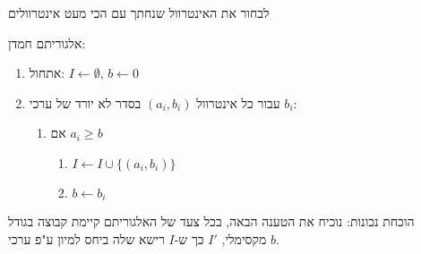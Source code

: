 לבחור את האינטרוול שנחתך עם הכי מעט אינטרוולים
\begin{center}
\end{center}
אלגוריתם חמדן:
\begin{enumerate}
\item
אתחול:
$I \leftarrow \emptyset$, 
$b \leftarrow 0$
\item
עבור כל אינטרוול 
$(a_i, b_i)$
בסדר לא יורד של ערכי 
$b_i$:
	\begin{enumerate}
	\item
	אם 
	$a_i \geq b$
		\begin{enumerate}
		\item
		$I \leftarrow I \cup \{(a_i, b_i)\}$
		\item
		$b \leftarrow b_i$				
		\end{enumerate}

	\end{enumerate}
\end{enumerate}

הוכחת נכונות: נוכיח את הטענה הבאה, בכל צעד של האלגוריתם קיימת קבוצה בגודל מקסימלי, 
$I'$
כך ש-$I$ רישא שלה ביחס למיון ע"פ ערכי $b$.

